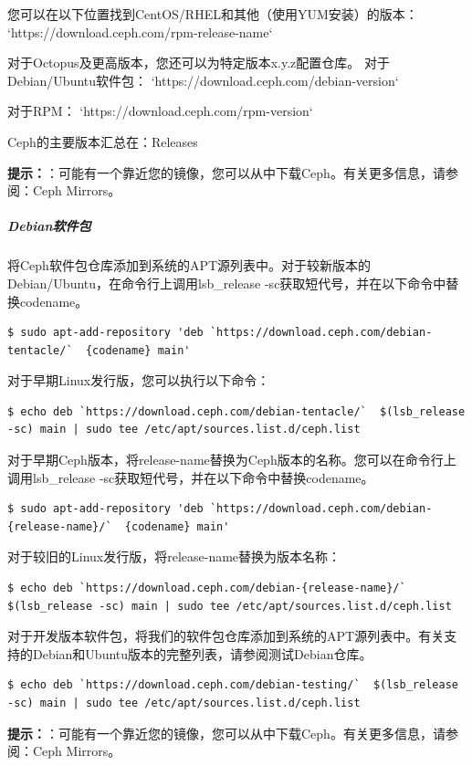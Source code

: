 \documentclass[12pt,UTF8]{ctexbook}
\begin{document}
您可以在以下位置找到CentOS/RHEL和其他（使用YUM安装）的版本：
`https://download.ceph.com/rpm-{release-name}`

对于Octopus及更高版本，您还可以为特定版本x.y.z配置仓库。
对于Debian/Ubuntu软件包：
`https://download.ceph.com/debian-{version}`

对于RPM：
`https://download.ceph.com/rpm-{version}`

Ceph的主要版本汇总在：Releases

\textbf{提示：}：可能有一个靠近您的镜像，您可以从中下载Ceph。有关更多信息，请参阅：Ceph Mirrors。

\subparagraph{Debian软件包}
将Ceph软件包仓库添加到系统的APT源列表中。对于较新版本的Debian/Ubuntu，在命令行上调用lsb_release -sc获取短代号，并在以下命令中替换{codename}。
\begin{verbatim}
$ sudo apt-add-repository 'deb `https://download.ceph.com/debian-tentacle/`  {codename} main'
\end{verbatim}

对于早期Linux发行版，您可以执行以下命令：
\begin{verbatim}
$ echo deb `https://download.ceph.com/debian-tentacle/`  $(lsb_release -sc) main | sudo tee /etc/apt/sources.list.d/ceph.list
\end{verbatim}

对于早期Ceph版本，将{release-name}替换为Ceph版本的名称。您可以在命令行上调用lsb_release -sc获取短代号，并在以下命令中替换{codename}。
\begin{verbatim}
$ sudo apt-add-repository 'deb `https://download.ceph.com/debian-{release-name}/`  {codename} main'
\end{verbatim}

对于较旧的Linux发行版，将{release-name}替换为版本名称：
\begin{verbatim}
$ echo deb `https://download.ceph.com/debian-{release-name}/`  $(lsb_release -sc) main | sudo tee /etc/apt/sources.list.d/ceph.list
\end{verbatim}

对于开发版本软件包，将我们的软件包仓库添加到系统的APT源列表中。有关支持的Debian和Ubuntu版本的完整列表，请参阅测试Debian仓库。
\begin{verbatim}
$ echo deb `https://download.ceph.com/debian-testing/`  $(lsb_release -sc) main | sudo tee /etc/apt/sources.list.d/ceph.list
\end{verbatim}

\textbf{提示：}：可能有一个靠近您的镜像，您可以从中下载Ceph。有关更多信息，请参阅：Ceph Mirrors。
\end{document}
